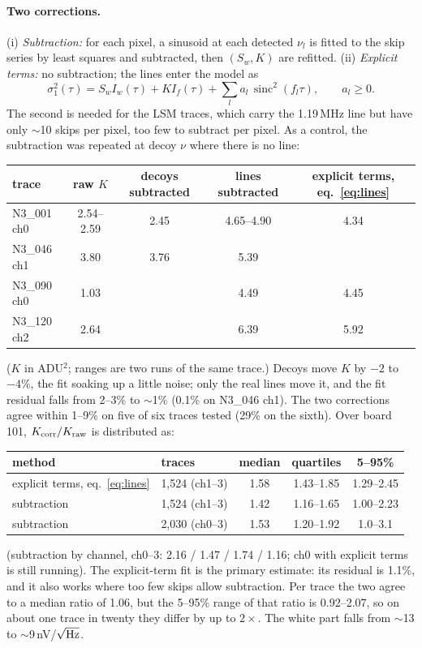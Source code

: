 \documentclass[10pt,a4paper]{article}
\newcommand{\sinc}{\operatorname{sinc}}
\begin{document}
\paragraph{Two corrections.} (i) \emph{Subtraction:} for each pixel, a sinusoid at each detected $\nu_l$ is fitted to
the skip series by least squares and subtracted, then $(S_w,K)$ are refitted. (ii) \emph{Explicit terms:} no
subtraction; the lines enter the model as
\begin{equation}
\sigma_1^2(\tau)=S_wI_w(\tau)+KI_f(\tau)+\sum_l a_l\,\sinc^2(f_l\tau),\qquad a_l\ge0 .\label{eq:lines}
\end{equation}
The second is needed for the LSM traces, which carry the 1.19\,MHz line but have only $\sim$10 skips per pixel, too few
to subtract per pixel. As a control, the subtraction was repeated at decoy $\nu$ where there is no line:
\begin{center}\small
\begin{tabular}{@{}lcccc@{}}\toprule
trace & raw $K$ & decoys subtracted & lines subtracted & explicit terms, eq.~\eqref{eq:lines}\\\midrule
N3\_001 ch0 & 2.54--2.59 & 2.45 & 4.65--4.90 & 4.34\\
N3\_046 ch1 & 3.80 & 3.76 & 5.39 & \\
N3\_090 ch0 & 1.03 & & 4.49 & 4.45\\
N3\_120 ch2 & 2.64 & & 6.39 & 5.92\\\bottomrule
\end{tabular}
\end{center}
($K$ in ADU$^2$; ranges are two runs of the same trace.) Decoys move $K$ by $-2$ to $-4\%$, the fit soaking up a little
noise; only the real lines move it, and the fit residual falls from 2--3\% to $\sim$1\% (0.1\% on N3\_046 ch1). The two
corrections agree within 1--9\% on five of six traces tested (29\% on the sixth). Over board 101, $K_{\rm corr}/K_{\rm raw}$ is distributed as:
\begin{center}\small
\begin{tabular}{@{}llccc@{}}\toprule
method & traces & median & quartiles & 5--95\%\\\midrule
explicit terms, eq.~\eqref{eq:lines} & 1,524 (ch1--3) & 1.58 & 1.43--1.85 & 1.29--2.45\\
subtraction & 1,524 (ch1--3) & 1.42 & 1.16--1.65 & 1.00--2.23\\
subtraction & 2,030 (ch0--3) & 1.53 & 1.20--1.92 & 1.0--3.1\\\bottomrule
\end{tabular}
\end{center}
(subtraction by channel, ch0--3: 2.16 / 1.47 / 1.74 / 1.16; ch0 with explicit terms is still running). The explicit-term
fit is the primary estimate: its residual is 1.1\%, and it also works where too few skips allow subtraction. Per
trace the two agree to a median ratio of 1.06, but the 5--95\% range of that ratio is 0.92--2.07, so on about one
trace in twenty they differ by up to $2\times$. The white part falls from $\sim$13 to $\sim$9\,nV/$\sqrt{\rm Hz}$.
\end{document}
